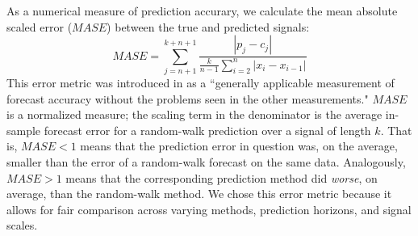 As a numerical measure of prediction accurary, we calculate the mean
absolute scaled error ($MASE$) between the true and predicted signals:
% 
$$MASE = \sum_{j=n+1}^{k+n+1}\frac{|p_j-c_j|
}{\frac{k}{n-1}\sum^n_{i=2}|x_{i}-x_{i-1}|}$$
% 
This error metric was introduced in \cite{MASE} as a ``generally
applicable measurement of forecast accuracy without the problems seen
in the other measurements."  $MASE$ is a normalized measure; the
scaling term in the denominator
% 
% 
is the average in-sample forecast error for a random-walk prediction
over a signal of length $k$.  That is, $MASE<1$ means that the
prediction error in question was, on the average, smaller than the
error of a random-walk forecast on the same data.  Analogously,
$MASE>1$ means that the corresponding prediction method did
\emph{worse}, on average, than the random-walk method.  We chose this
error metric because it allows for fair comparison across varying
methods, prediction horizons, and signal scales.

